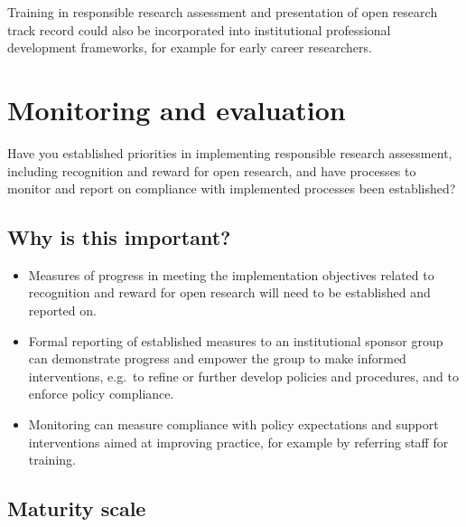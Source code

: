 \documentclass[
  letterpaper,
  DIV=11,
  numbers=noendperiod,
  oneside]{scrreprt}
\begin{document}
Training in responsible research assessment and presentation of open
research track record could also be incorporated into institutional
professional development frameworks, for example for early career
researchers.


\chapter{Monitoring and evaluation}\label{monitoring-and-evaluation}

\begin{tcolorbox}[enhanced jigsaw, colback=white, toprule=.15mm, colframe=quarto-callout-color-frame, arc=.35mm, opacityback=0, bottomrule=.15mm, breakable, left=2mm, leftrule=.75mm, rightrule=.15mm]

Have you established priorities in implementing responsible research
assessment, including recognition and reward for open research, and have
processes to monitor and report on compliance with implemented processes
been established?

\end{tcolorbox}

\section{Why is this important?}\label{why-is-this-important-7}

\begin{itemize}
\item
  Measures of progress in meeting the implementation objectives related
  to recognition and reward for open research will need to be
  established and reported on.
\item
  Formal reporting of established measures to an institutional sponsor
  group can demonstrate progress and empower the group to make informed
  interventions, e.g.~to refine or further develop policies and
  procedures, and to enforce policy compliance.
\item
  Monitoring can measure compliance with policy expectations and support
  interventions aimed at improving practice, for example by referring
  staff for training.
\end{itemize}

\section{Maturity scale}\label{maturity-scale-7}
\end{document}
